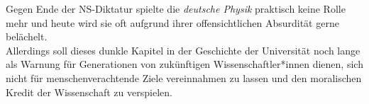 Gegen Ende der NS-Diktatur spielte die \textit{deutsche Physik} praktisch keine Rolle mehr und heute wird sie oft aufgrund ihrer offensichtlichen Absurdität gerne belächelt.\\ Allerdings soll dieses dunkle Kapitel in der Geschichte der Universität noch lange als Warnung für Generationen von zukünftigen Wissenschaftler*innen dienen, sich nicht für menschenverachtende Ziele vereinnahmen zu lassen und den moralischen Kredit der Wissenschaft zu verspielen.

